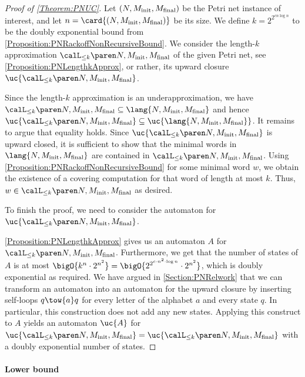 \documentclass[../../diss.tex]{subfiles}
\begin{document}
\begin{proof}[Proof of \cref{Theorem:PNUC}]
    Let $(N,M_{\text{init}},M_{\text{final}})$ be the Petri net instance of interest, and let $n = \card{(N,\Minit,\Mfinal)}$ be its size.
    We define $k = 2^{2^{c n \log n}}$ to be the doubly exponential bound from \cref{Proposition:PNRackoffNonRecursiveBound}.
    We consider the length-$k$ approximation $\languak{k}{N,\Minit,\Mfinal}$ of the given Petri net, see \cref{Proposition:PNLengthkApprox}, or rather, its upward closure $\uc{\languak{k}{N,\Minit,\Mfinal}}$.

    Since the length-$k$ approximation is an underapproximation, we have $\languak{k}{N,\Minit,\Mfinal} \subseteq \lang{N,\Minit,\Mfinal}$ and hence $\uc{\languak{k}{N,\Minit,\Mfinal}} \subseteq \uc{\lang{N,\Minit,\Mfinal}}$.
    It remains to argue that equality holds.
    Since $\uc{\languak{k}{N,\Minit,\Mfinal}}$ is upward closed, it is sufficient to show that the minimal words in $\lang{N,\Minit,\Mfinal}$ are contained in $\languak{k}{N,\Minit,\Mfinal}$.
    Using \cref{Proposition:PNRackoffNonRecursiveBound} for some minimal word $w$, we obtain the existence of a covering computation for that word of length at most $k$.
    Thus, $w \in \languak{k}{N,\Minit,\Mfinal}$ as desired.

    To finish the proof, we need to consider the automaton for $\uc{\languak{k}{N,\Minit,\Mfinal}}$.

    \cref{Proposition:PNLengthkApprox} gives us an automaton $A$ for $\languak{k}{N,\Minit,\Mfinal}$.
    Furthermore, we get that the number of states of $A$ is at most $\bigO{k^n \cdot 2^{n^2}} = \bigO{2^{2^{c \cdot n^2 \cdot \log n}} \cdot 2^{n^2}}$, which is doubly exponential as required.
    We have argued in \cref{Section:PNRelwork} that we can transform an automaton into an automaton for the upward closure by inserting self-loops $q \tow{a} q$ for every letter of the alphabet $a$ and every state $q$.
    In particular, this construction does not add any new states.
    Applying this construct to $A$ yields an automaton $\uc{A}$ for $\uc{\languak{k}{N,\Minit,\Mfinal}} = \uc{\languak{k}{N,\Minit,\Mfinal}}$ with a doubly exponential number of states.
\end{proof}

\paragraph{Lower bound}
\end{document}

